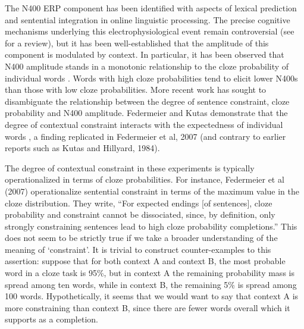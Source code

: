 \documentclass{article}
\begin{document}
The N400 ERP component has been identified with aspects of lexical prediction and sentential integration in online linguistic processing. The precise cognitive mechanisms underlying this electrophysiological event remain controversial (see \cite{kutas2000electrophysiology} for a review), but it has been well-established that the amplitude of this component is modulated by context. In particular, it has been observed that N400 amplitude stands in a monotonic relationship to the cloze probability of individual words \cite{kutas1984brain}. Words with high cloze probabilities tend to elicit lower N400s than those with low cloze probabilities. More recent work has sought to disambiguate the relationship between the degree of sentence constraint, cloze probability and N400 amplitude. Federmeier and Kutas demonstrate that the degree of contextual constraint interacts with the expectedness of individual words \cite{federmeier1999rose}, a finding replicated in \cite{federmeier2007multiple} Federmeier et al, 2007 (and contrary to earlier reports such as \cite{kutas1984brain} Kutas and Hillyard, 1984).

The degree of contextual constraint in these experiments is typically operationalized in terms of cloze probabilities. For instance, Federmeier et al (2007) \cite{federmeier2007multiple} operationalize sentential constraint in terms of the maximum value in the cloze distribution. They write, “For expected endings [of sentences], cloze probability and constraint cannot be dissociated, since, by definition, only strongly constraining sentences lead to high cloze probability completions.” This does not seem to be strictly true if we take a broader understanding of the meaning of ‘constraint’. It is trivial to construct counter-examples to this assertion: suppose that for both context A and context B, the most probable word in a cloze task is 95\%, but in context A the remaining probability mass is spread among ten words, while in context B, the remaining 5\% is spread among 100 words. Hypothetically, it seems that we would want to say that context A is more constraining than context B, since there are fewer words overall which it supports as a completion.
\end{document}
